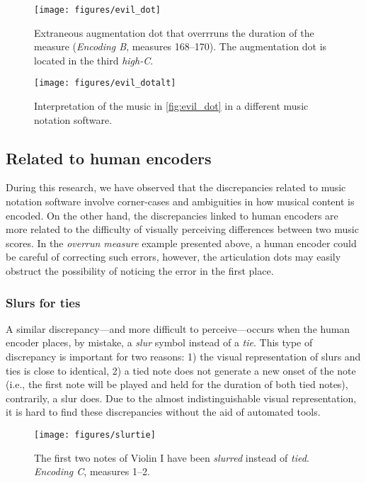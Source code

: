 \begin{figure}[h]
\texttt{[image: figures/evil\_dot]}
\caption{Extraneous augmentation dot that overrruns the duration of the measure (\emph{Encoding B}, measures 168--170). The augmentation dot is located in the third \emph{high-C}. }
\label{fig:evil_dot}
\end{figure}
\begin{figure}[h]
\texttt{[image: figures/evil\_dotalt]}
\caption{Interpretation of the music in \autoref{fig:evil_dot} in a different music notation software.}
\label{fig:evil_dotalt}
\end{figure}

\subsection{Related to human encoders}
During this research, we have observed that the discrepancies related to music notation software involve corner-cases and ambiguities in how musical content is encoded. On the other hand, the discrepancies linked to human encoders are more related to the difficulty of visually perceiving differences between two music scores. In the \emph{overrun measure} example presented above, a human encoder could be careful of correcting such errors, however, the articulation dots may easily obstruct the possibility of noticing the error in the first place.

\subsubsection{Slurs for ties}
A similar discrepancy---and more difficult to perceive---occurs when the human encoder places, by mistake, a \emph{slur} symbol instead of a \emph{tie}. This type of discrepancy is important for two reasons: 1) the visual representation of slurs and ties is close to identical, 2) a tied note does not generate a new onset of the note (i.e., the first note will be played and held for the duration of both tied notes), contrarily, a slur does. Due to the almost indistinguishable visual representation, it is hard to find these discrepancies without the aid of automated tools.

\begin{figure}[h]
\texttt{[image: figures/slurtie]}
\caption{The first two notes of Violin I have been \emph{slurred} instead of \emph{tied}. \emph{Encoding C}, measures 1--2.}
\label{fig:slurtie}
\end{figure}

